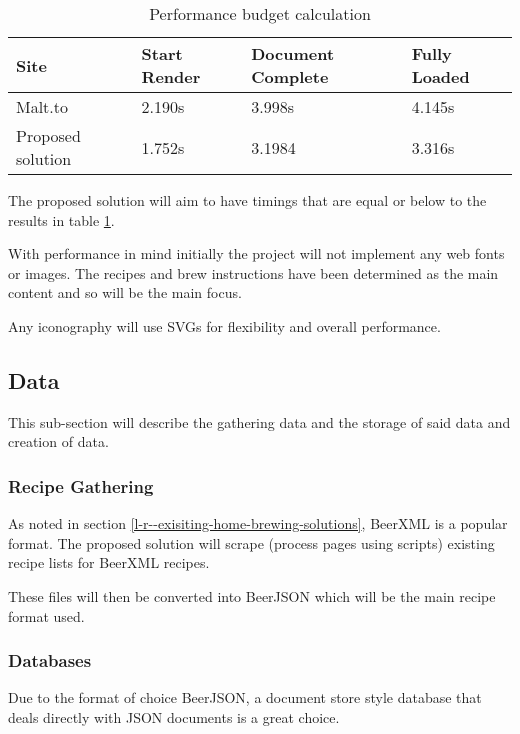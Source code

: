 \begin{table}[H]
\centering
\begin{tabular}{|l|l|l|l|}
\hline
\textbf{Site}     & \textbf{Start Render} & \textbf{Document Complete} & \textbf{Fully Loaded} \\ \hline
Malt.to           & 2.190s                & 3.998s                     & 4.145s                \\ \hline
Proposed solution & 1.752s                & 3.1984                     & 3.316s                \\ \hline
\end{tabular}
\caption{Performance budget calculation}
\label{table-performance-budget}
\end{table}

The proposed solution will aim to have timings that are equal or below to the results in table \ref{table-performance-budget}.

With performance in mind initially the project will not implement any web fonts or images. The recipes and brew instructions have been determined as the main content and so will be the main focus.

Any iconography will use SVGs for flexibility and overall performance.

\subsection{Data} \label{a-d--data}

This sub-section will describe the gathering data and the storage of said data and creation of data.

\subsubsection{Recipe Gathering}

As noted in section \ref{l-r--exisiting-home-brewing-solutions}, BeerXML is a popular format.
The proposed solution will scrape (process pages using scripts) existing recipe lists for BeerXML recipes.

These files will then be converted into BeerJSON which will be the main recipe format used.

\subsubsection{Databases}

Due to the format of choice BeerJSON, a document store style database that deals directly with JSON documents is a great choice.

